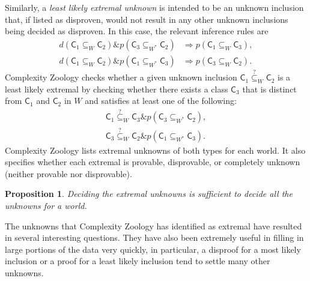 \documentclass[12pt]{amsart}
\newtheorem*{proposition}{Proposition}
\theoremstyle{definition}
\theoremstyle{remark}
\newcommand{\sC}{\mathsf{C}}
\newcommand{\AND}{\mathbin{\&}}
\newcommand{\subsetequ}{\stackrel{?}{\subseteq}}
\begin{document}
Similarly, a \textit{least likely extremal unknown} is intended to be an
unknown inclusion that, if listed as disproven, would not result in any other
unknown inclusions being decided as disproven. In this case, the relevant
inference rules are
\begin{align*}
d(\sC_1\subseteq_W\sC_2)\AND p(\sC_3\subseteq_{W^*}\sC_2)&\Longrightarrow
p(\sC_1\subseteq_W\sC_3), \\
d(\sC_1\subseteq_W\sC_2)\AND p(\sC_1\subseteq_{W^*}\sC_3)&\Longrightarrow
p(\sC_3\subseteq_W\sC_2).
\end{align*}
Complexity Zoology checks whether a given unknown inclusion
$\sC_1\subsetequ_W\sC_2$ is a least likely extremal by checking whether there
exists a class $\sC_3$ that is distinct from $\sC_1$ and $\sC_2$ in $W$ and
satisfies at least one of the following:
\begin{align*}
\sC_1\subsetequ_W\sC_3\AND p(\sC_3\subseteq_{W^*}\sC_2), \\
\sC_3\subsetequ_W\sC_2\AND p(\sC_1\subseteq_{W^*}\sC_3).
\end{align*}
Complexity Zoology lists extremal unknowns of both types for each world. It
also specifies whether each extremal is provable, disprovable, or completely
unknown (neither provable nor disprovable).
\begin{proposition}
Deciding the extremal unknowns is sufficient to decide all the unknowns for a
world.
\end{proposition}
The unknowns that Complexity Zoology has identified as extremal have resulted
in several interesting questions. They have also been extremely useful in
filling in large portions of the data very quickly, in particular, a disproof
for a most likely inclusion or a proof for a least likely inclusion tend to
settle many other unknowns.
\end{document}
